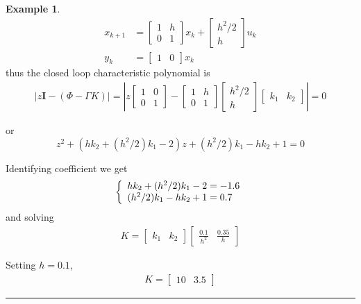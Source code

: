 \documentclass[nols]{tufte-handout}
\theoremstyle{definition}
\newtheorem{exmp}{Example}[section]
\begin{document}
\begin{exmp}
\begin{align*} 
x_{k+1} &=
\begin{bmatrix}
1 & h\\
0 & 1
\end{bmatrix}
x_{k}+
\begin{bmatrix}
h^{2}/2\\
h
\end{bmatrix}
u_{k}\\
y_k &=
\begin{bmatrix}
1 & 0
\end{bmatrix}
x_{k}
\end{align*}
thus the closed loop characteristic polynomial is
\begin{align*} 
    \left\vert z\mathbf{I}-(\Phi-\Gamma K)\right\vert=\left\vert z
\begin{bmatrix}
        1 & 0\\
0 & 1
\end{bmatrix}
-
\begin{bmatrix}
1 & h\\
0 & 1
\end{bmatrix}
\begin{bmatrix}
h^{2}/2\\
h
\end{bmatrix}
\begin{bmatrix}
k_{1} & k_{2}%
\end{bmatrix} 
\right\vert =0
\end{align*}


or
\[
z^{2}+(hk_{2}+(h^{2}/2)k_{1}-2)z+(h^{2}/2)k_{1}-hk_{2}+1=0
\]


Identifying coefficient we get
\[
\left\{
\begin{array}
[c]{l}%
hk_{2}+(h^{2}/2)k_{1}-2=-1.6\\
(h^{2}/2)k_{1}-hk_{2}+1=0.7
\end{array}
\right.
\]
and solving
\begin{align*}
K=
\begin{bmatrix}
    k_{1} & k_{2}%
\end{bmatrix}
\begin{bmatrix}
\frac{0.1}{h^{2}} & \frac{0.35}{h}%
\end{bmatrix}
\end{align*}

Setting  $h=0.1$,
\begin{align*}
K=
\begin{bmatrix}
10 & 3.5
\end{bmatrix}
\end{align*}
\end{exmp}
\hrule height 1pt
\end{document}
